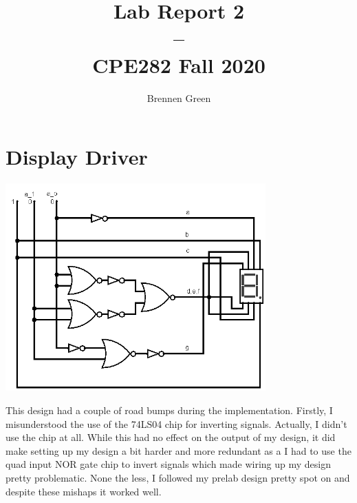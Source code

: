\documentclass[11pt]{article}
\begin{document}
\date{} 
\title{Lab Report 2\\--\\\large CPE282 Fall 2020}
\author{Brennen Green}
\maketitle

\section*{Display Driver}
\begin{center}
\includegraphics[width=10cm, keepaspectratio]{DisplayDriver}\newline
\end{center}
This design had a couple of road bumps during the implementation. Firstly, I misunderstood the use of the 74LS04 chip for inverting signals. Actually, I didn't use the chip at all.
While this had no effect on the output of my design, it did make setting up my design a bit harder and more redundant as a I had to use the quad input NOR gate chip to invert signals which
made wiring up my design pretty problematic. None the less, I followed my prelab design pretty spot on and despite these mishaps it worked well.
\end{document}
